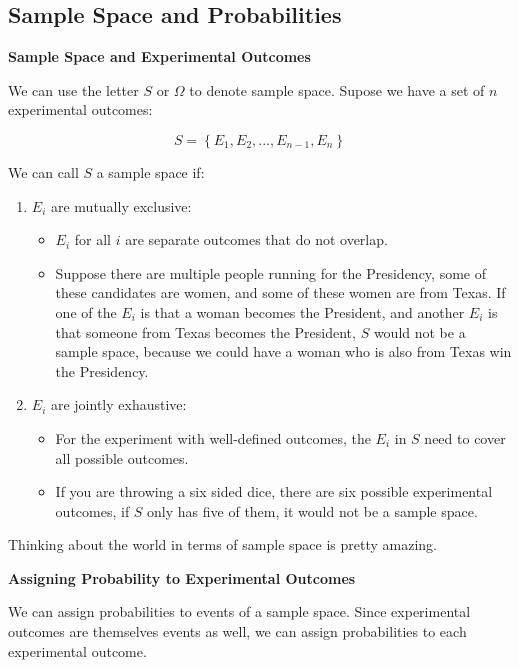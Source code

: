 \documentclass[
]{book}
\providecommand{\tightlist}{%
  \setlength{\itemsep}{0pt}\setlength{\parskip}{0pt}}
\begin{document}
\hypertarget{sample-space-and-probabilities}{%
\subsection{Sample Space and Probabilities}\label{sample-space-and-probabilities}}

\textbf{Sample Space and Experimental Outcomes}

We can use the letter \(S\) or \(\Omega\) to denote sample space. Supose we have a set of \(n\) experimental outcomes:

\[S = \left\{ E_1, E_2, ..., E_{n-1}, E_n\right\}\]

We can call \(S\) a sample space if:

\begin{enumerate}
\def\labelenumi{\arabic{enumi}.}
\tightlist
\item
  \(E_i\) are mutually exclusive:

  \begin{itemize}
  \tightlist
  \item
    \(E_i\) for all \(i\) are separate outcomes that do not overlap.
  \item
    Suppose there are multiple people running for the Presidency, some of these candidates are women, and some of these women are from Texas. If one of the \(E_i\) is that a woman becomes the President, and another \(E_i\) is that someone from Texas becomes the President, \(S\) would not be a sample space, because we could have a woman who is also from Texas win the Presidency.
  \end{itemize}
\item
  \(E_i\) are jointly exhaustive:

  \begin{itemize}
  \tightlist
  \item
    For the experiment with well-defined outcomes, the \(E_i\) in \(S\) need to cover all possible outcomes.
  \item
    If you are throwing a six sided dice, there are six possible experimental outcomes, if \(S\) only has five of them, it would not be a sample space.
  \end{itemize}
\end{enumerate}

Thinking about the world in terms of sample space is pretty amazing.

\textbf{Assigning Probability to Experimental Outcomes}

We can assign probabilities to events of a sample space. Since experimental outcomes are themselves events as well, we can assign probabilities to each experimental outcome.
\end{document}
